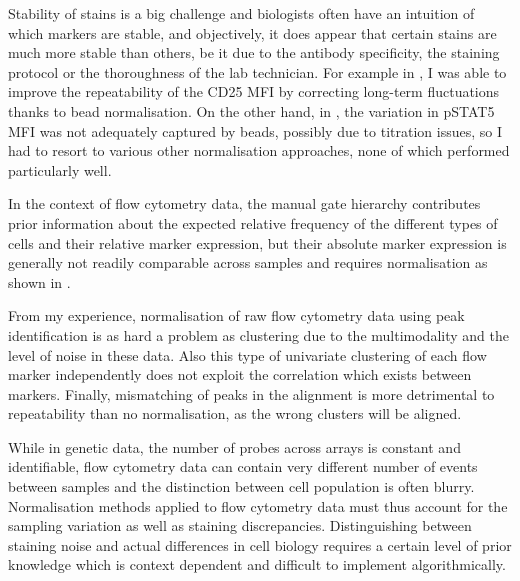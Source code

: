 Stability of stains is a big challenge and biologists often have an intuition of which markers are stable, and objectively, it does appear that certain stains are much more stable than others, be it due to the antibody specificity, the staining protocol or the thoroughness of the lab technician.
For example in , I was able to improve the repeatability of the CD25 MFI by correcting long-term fluctuations thanks to bead normalisation.
On the other hand, in , the variation in pSTAT5 MFI was not adequately captured by beads, possibly due to titration issues, so I had to resort to various other normalisation approaches, none of which performed particularly well.

In the context of flow cytometry data, the manual gate hierarchy contributes prior information about the expected relative frequency of the different types of cells and their relative marker expression, but their absolute marker expression is generally not readily comparable across samples and requires normalisation as shown in .

From my experience, normalisation of raw flow cytometry data using peak identification is as hard a problem as clustering due to the multimodality and the level of noise in these data.
Also this type of univariate clustering of each flow marker independently does not exploit the correlation which exists between markers.
Finally, mismatching of peaks in the alignment is more detrimental to repeatability than no normalisation, as the wrong clusters will be aligned.

While in genetic data, the number of probes across arrays is constant and identifiable, flow cytometry data can contain very different number of events between samples and the distinction between cell population is often blurry.
Normalisation methods applied to flow cytometry data must thus account for the sampling variation as well as staining discrepancies.
Distinguishing between staining noise and actual differences in cell biology requires a certain level of prior knowledge which is context dependent and difficult to implement algorithmically.

